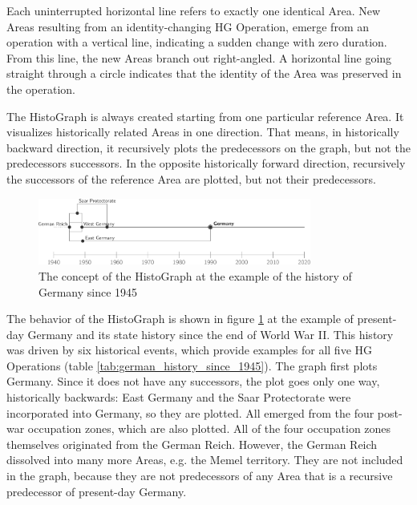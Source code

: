 Each uninterrupted horizontal line refers to exactly one identical Area. New Areas resulting from an identity-changing HG Operation, emerge from an operation with a vertical line, indicating a sudden change with zero duration. From this line, the new Areas branch out right-angled. A horizontal line going straight through a circle indicates that the identity of the Area was preserved in the operation.

The HistoGraph is always created starting from one particular reference Area. It visualizes historically related Areas in one direction. That means, in historically backward direction, it recursively plots the predecessors on the graph, but not the predecessors successors. In the opposite historically forward direction, recursively the successors of the reference Area are plotted, but not their predecessors.

\begin{figure}[H]
  \vspace{1em}
  \centering
  \includegraphics[width=0.8\textwidth]{graphics/development/histograph/example_germany}
  \caption{The concept of the HistoGraph at the example of the history of Germany since 1945}
  \label{fig:example_germany}
\end{figure}

The behavior of the HistoGraph is shown in figure \ref{fig:example_germany} at the example of present-day Germany and its state history since the end of World War II. This history was driven by six historical events, which provide examples for all five HG Operations (table \ref{tab:german_history_since_1945}). The graph first plots Germany. Since it does not have any successors, the plot goes only one way, historically backwards: East Germany and the Saar Protectorate were incorporated into Germany, so they are plotted. All emerged from the four post-war occupation zones, which are also plotted. All of the four occupation zones themselves originated from the German Reich. However, the German Reich dissolved into many more Areas, e.g. the Memel territory. They are not included in the graph, because they are not predecessors of any Area that is a recursive predecessor of present-day Germany.

